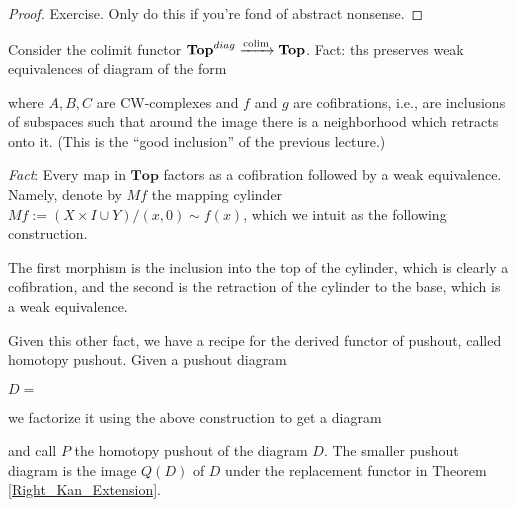 \documentclass[../MH_Total.tex]{subfiles}
\begin{document}
\begin{proof}
	Exercise. Only do this if you're fond of abstract nonsense.
\end{proof}

\begin{example}
	Consider the colimit functor $\mathbf{Top}^{diag} \xrightarrow{\operatorname{colim}}\mathbf{Top}$. Fact: ths preserves weak equivalences of diagram of the form
	\begin{center}
	\end{center}
	where $A,B,C$ are CW-complexes and $f$ and $g$ are cofibrations, i.e., are inclusions of subspaces such that around the image there is a neighborhood which retracts onto it. (This is the ``good inclusion'' of the previous lecture.)
\end{example}

\emph{Fact}: Every map in $\mathbf{Top}$ factors as a cofibration followed by a weak equivalence. Namely, denote by $Mf$ the mapping cylinder $Mf := (X \times I \cup Y)/(x,0) \sim f(x)$, which we intuit as the following construction.

\begin{figure}[h]
\end{figure}

The first morphism is the inclusion into the top of the cylinder, which is clearly a cofibration, and the second is the retraction of the cylinder to the base, which is a weak equivalence.

Given this other fact, we have a recipe for the derived functor of pushout, called homotopy pushout. Given a pushout diagram
\begin{center}
$D=$
\end{center}
we factorize it using the above construction to get a diagram
\begin{center}
\end{center}
and call $P$ the homotopy pushout of the diagram $D$. The smaller pushout diagram is the image $Q(D)$ of $D$ under the replacement functor in Theorem \ref{Right_Kan_Extension}. 
\end{document}
